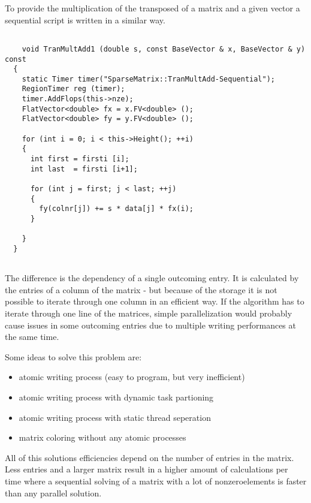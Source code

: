 \documentclass[a4paper,11pt]{scrartcl}
\begin{document}
To provide the multiplication of the transposed of a matrix and a given vector
 a sequential script is written in a similar way.

\begin{lstlisting}

	void TranMultAdd1 (double s, const BaseVector & x, BaseVector & y) const
  {
    static Timer timer("SparseMatrix::TranMultAdd-Sequential");
    RegionTimer reg (timer);
    timer.AddFlops(this->nze);
    FlatVector<double> fx = x.FV<double> ();
    FlatVector<double> fy = y.FV<double> ();

    for (int i = 0; i < this->Height(); ++i)
    {
      int first = firsti [i];
      int last  = firsti [i+1];

      for (int j = first; j < last; ++j)
      {
        fy(colnr[j]) += s * data[j] * fx(i);
      }

    }
  }


\end{lstlisting}

The difference is the dependency of a single outcoming entry. It is calculated
 by the entries of a column of the matrix - but because of the storage it is not
possible to iterate through one column in an efficient way. If the algorithm 
has to iterate through one line of the matrices, simple parallelization would
probably cause issues in some outcoming entries due to multiple writing
performances at the same time. 

Some ideas to solve this problem are:

\begin{itemize}

\item atomic writing process (easy to program, but very inefficient)
\item atomic writing process with dynamic task partioning
\item atomic writing process with static thread seperation
\item matrix coloring without any atomic processes

\end{itemize} 

All of this solutions efficiencies depend on the number of entries in the matrix.
Less entries and a larger matrix result in a higher amount of calculations per
 time where a sequential solving of a matrix with a lot of nonzeroelements is
 faster than any parallel solution.
\end{document}
